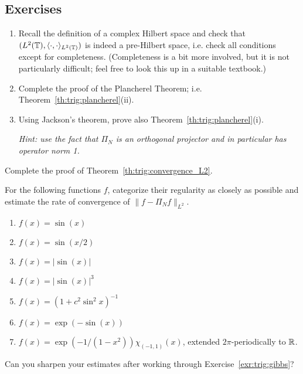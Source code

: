 \subsection{Exercises}

\begin{exercise} \label{exr:trig:hilbert-onb}
  \begin{enumerate} \ilist
    \item Recall the definition of a complex Hilbert space and
        check that $( L^2(\mathbb{T}), \langle \cdot, \cdot \rangle_{L^2(\mathbb{T})} )$ is indeed
        a pre-Hilbert space, i.e. check all conditions except for completeness.
        (Completeness is a bit more involved, but it is not particularly
        difficult; feel free to look this up  in a suitable textbook.)

    \item Complete the proof of the Plancherel Theorem; i.e.
      Theorem~\ref{th:trig:plancherel}(ii).

    \item Using Jackson's theorem, prove also
    Theorem~\ref{th:trig:plancherel}(i).

    {\it Hint: use the fact that $\Pi_N$ is an orthogonal projector and
    in particular has operator norm 1.}
  \end{enumerate}
\end{exercise}

\begin{exercise} \label{exr:trig:convergence_L2}
  Complete the proof of Theorem~\ref{th:trig:convergence_L2}.
\end{exercise}

\begin{exercise} \label{exr:trig:functions}
  For the following functions $f$, categorize their regularity as closely as
  possible and estimate the rate of convergence of $\|f-\Pi_N f\|_{L^2}$.
  \begin{enumerate} \ilist
    \item  $f(x) = \sin(x)$
    \item  $f(x) = \sin(x/2)$
    \item $f(x) = |\sin(x)|$
    \item $f(x) = |\sin(x)|^3$
    \item $f(x) = (1 + c^2 \sin^2 x)^{-1}$
    \item $f(x) = \exp( - \sin(x))$
    \item $f(x) = \exp( - 1 / (1-x^2) ) \chi_{(-1,1)}(x)$, extended $2\pi$-periodically to $\mathbb{R}$.
  \end{enumerate}
  Can you sharpen your estimates after working through
  Exercise~\ref{exr:trig:gibbs}?
\end{exercise}



